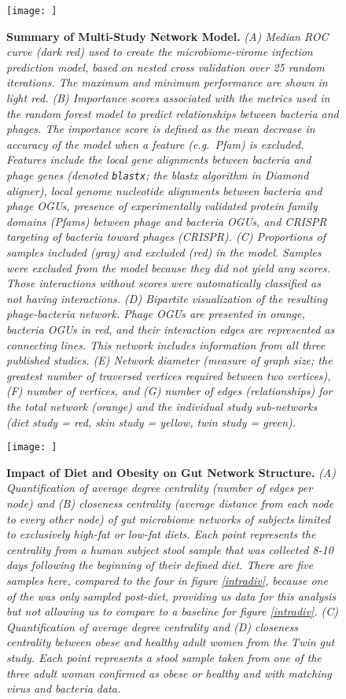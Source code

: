 \documentclass[12pt,]{article}
\begin{document}
\begin{figure}[htbp]
\centering
\texttt{[image: ]}
\caption{\textbf{Summary of Multi-Study Network Model.} \emph{(A) Median
ROC curve (dark red) used to create the microbiome-virome infection
prediction model, based on nested cross validation over 25 random
iterations. The maximum and minimum performance are shown in light red.
(B) Importance scores associated with the metrics used in the random
forest model to predict relationships between bacteria and phages. The
importance score is defined as the mean decrease in accuracy of the
model when a feature (e.g.~Pfam) is excluded. Features include the local
gene alignments between bacteria and phage genes (denoted
\texttt{blastx}; the blastx algorithm in Diamond aligner), local genome
nucleotide alignments between bacteria and phage OGUs, presence of
experimentally validated protein family domains (Pfams) between phage
and bacteria OGUs, and CRISPR targeting of bacteria toward phages
(CRISPR). (C) Proportions of samples included (gray) and excluded (red)
in the model. Samples were excluded from the model because they did not
yield any scores. Those interactions without scores were automatically
classified as not having interactions. (D) Bipartite visualization of
the resulting phage-bacteria network. Phage OGUs are presented in
orange, bacteria OGUs in red, and their interaction edges are
represented as connecting lines. This network includes information from
all three published studies. (E) Network diameter (measure of graph
size; the greatest number of traversed vertices required between two
vertices), (F) number of vertices, and (G) number of edges
(relationships) for the total network (orange) and the individual study
sub-networks (diet study = red, skin study = yellow, twin study =
green).} \label{RocCurve}}
\end{figure}

\begin{figure}[htbp]
\centering
\texttt{[image: ]}
\caption{\textbf{Impact of Diet and Obesity on Gut Network Structure.}
\emph{(A) Quantification of average degree centrality (number of edges
per node) and (B) closeness centrality (average distance from each node
to every other node) of gut microbiome networks of subjects limited to
exclusively high-fat or low-fat diets. Each point represents the
centrality from a human subject stool sample that was collected 8-10
days following the beginning of their defined diet. There are five
samples here, compared to the four in figure \ref{intradiv}, because one
of the was only sampled post-diet, providing us data for this analysis
but not allowing us to compare to a baseline for figure \ref{intradiv}.
(C) Quantification of average degree centrality and (D) closeness
centrality between obese and healthy adult women from the Twin gut
study. Each point represents a stool sample taken from one of the three
adult woman confirmed as obese or healthy and with matching virus and
bacteria data.} \label{dietnetworks}}
\end{figure}
\end{document}
